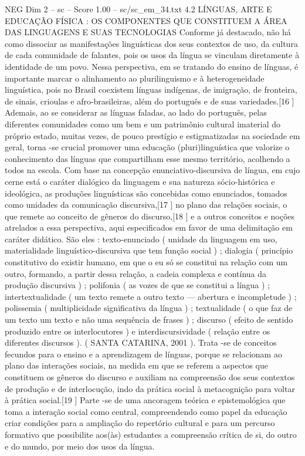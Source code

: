 \begin{textsample}{NEG Dim 2 – sc – Score 1.00 – sc/sc\_em\_34.txt}  \label{ex:f2_neg_271}
4.2 LÍNGUAS, ARTE E EDUCAÇÃO FÍSICA : OS COMPONENTES QUE CONSTITUEM A ÁREA DAS LINGUAGENS E SUAS TECNOLOGIAS Conforme já destacado, não há como dissociar as manifestações linguísticas dos seus contextos de uso, da cultura de cada comunidade de falantes, pois os usos da língua se vinculam diretamente à identidade de um povo.
Nessa perspectiva, em se tratando do ensino de línguas, é importante marcar o alinhamento ao plurilinguismo e à heterogeneidade linguística, pois no Brasil coexistem línguas indígenas, de imigração, de fronteira, de sinais, crioulas e afro-brasileiras, além do português e de suas variedades.[16 ] Ademais, ao se considerar as línguas faladas, ao lado do português, pelas diferentes comunidades como um bem e um patrimônio cultural imaterial do próprio estado, muitas vezes, de pouco prestígio e estigmatizadas na sociedade em geral, torna -se crucial promover uma educação (pluri)linguística que valorize o conhecimento das línguas que compartilham esse mesmo território, acolhendo a todos na escola.
Com base na concepção enunciativo-discursiva de língua, em cujo cerne está o caráter dialógico da linguagem e sua natureza sócio-histórica e ideológica, as produções linguísticas são concebidas como enunciados, tomados como unidades da comunicação discursiva,[17 ] no plano das relações sociais, o que remete ao conceito de gêneros do discurso,[18 ] e a outros conceitos e noções atrelados a essa perspectiva, aqui especificados em favor de uma delimitação em caráter didático.
São eles : texto-enunciado ( unidade da linguagem em uso, materialidade linguístico-discursiva que tem função social ) ; dialogia ( princípio constitutivo do existir humano, em que o eu só se constitui na relação com um outro, formando, a partir dessa relação, a cadeia complexa e contínua da produção discursiva ) ; polifonia ( as vozes de que se constitui a língua ) ; intertextualidade ( um texto remete a outro texto — abertura e incompletude ) ; polissemia ( multiplicidade significativa da língua ) ; textualidade ( o que faz de um texto um texto e não uma sequência de frases ) ; discurso ( efeito de sentido produzido entre os interlocutores ) e interdiscursividade ( relação entre os diferentes discursos ). ( SANTA CATARINA, 2001 ).
Trata -se de conceitos fecundos para o ensino e a aprendizagem de línguas, porque se relacionam ao plano das interações sociais, na medida em que se referem a aspectos que constituem os gêneros do discurso e auxiliam na compreensão dos seus contextos de produção e de interlocução, indo da prática social à metacognição para voltar à prática social.[19 ] Parte -se de uma ancoragem teórica e epistemológica que toma a interação social como central, compreendendo como papel da educação criar condições para a ampliação do repertório cultural e para um percurso formativo que possibilite aos(às) estudantes a compreensão crítica de si, do outro e do mundo, por meio dos usos da língua.

\end{textsample}
